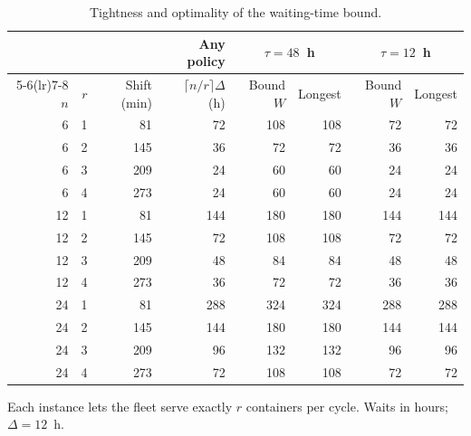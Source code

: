 \begin{table}[!htbp]
\caption{Tightness and optimality of the waiting-time bound.}
\label{tab:tightness}
\centering
\small
\begin{tabular}{rrrrrrrr}
\toprule
& & & Any policy & \multicolumn{2}{c}{$\tau = 48$~h} & \multicolumn{2}{c}{$\tau = 12$~h} \\
\cmidrule(lr){5-6}\cmidrule(lr){7-8}
$n$ & $r$ & Shift (min) & $\lceil n/r \rceil \Delta$ (h) & Bound $W$ & Longest & Bound $W$ & Longest \\
\midrule
6 & 1 & 81 & 72 & 108 & 108 & 72 & 72 \\
6 & 2 & 145 & 36 & 72 & 72 & 36 & 36 \\
6 & 3 & 209 & 24 & 60 & 60 & 24 & 24 \\
6 & 4 & 273 & 24 & 60 & 60 & 24 & 24 \\
12 & 1 & 81 & 144 & 180 & 180 & 144 & 144 \\
12 & 2 & 145 & 72 & 108 & 108 & 72 & 72 \\
12 & 3 & 209 & 48 & 84 & 84 & 48 & 48 \\
12 & 4 & 273 & 36 & 72 & 72 & 36 & 36 \\
24 & 1 & 81 & 288 & 324 & 324 & 288 & 288 \\
24 & 2 & 145 & 144 & 180 & 180 & 144 & 144 \\
24 & 3 & 209 & 96 & 132 & 132 & 96 & 96 \\
24 & 4 & 273 & 72 & 108 & 108 & 72 & 72 \\
\bottomrule
\end{tabular}
\par\smallskip\footnotesize Each instance lets the fleet serve exactly $r$ containers per cycle. Waits in hours; $\Delta = 12$~h.
\end{table}
